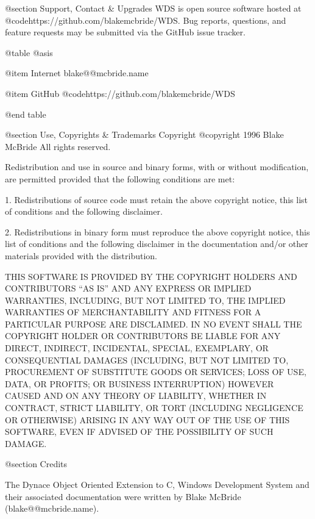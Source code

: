 @section Support, Contact & Upgrades
WDS is open source software hosted at
@code{https://github.com/blakemcbride/WDS}.  Bug reports, questions,
and feature requests may be submitted via the GitHub issue tracker.

@table @asis

@item Internet
blake@@mcbride.name

@item GitHub
@code{https://github.com/blakemcbride/WDS}

@end table




@section Use, Copyrights & Trademarks
Copyright  @copyright{} 1996 Blake McBride
All rights reserved.

Redistribution and use in source and binary forms, with or without
modification, are permitted provided that the following conditions are
met:

1. Redistributions of source code must retain the above copyright
notice, this list of conditions and the following disclaimer.

2. Redistributions in binary form must reproduce the above copyright
notice, this list of conditions and the following disclaimer in the
documentation and/or other materials provided with the distribution.

THIS SOFTWARE IS PROVIDED BY THE COPYRIGHT HOLDERS AND CONTRIBUTORS
``AS IS'' AND ANY EXPRESS OR IMPLIED WARRANTIES, INCLUDING, BUT NOT
LIMITED TO, THE IMPLIED WARRANTIES OF MERCHANTABILITY AND FITNESS FOR
A PARTICULAR PURPOSE ARE DISCLAIMED. IN NO EVENT SHALL THE COPYRIGHT
HOLDER OR CONTRIBUTORS BE LIABLE FOR ANY DIRECT, INDIRECT, INCIDENTAL,
SPECIAL, EXEMPLARY, OR CONSEQUENTIAL DAMAGES (INCLUDING, BUT NOT
LIMITED TO, PROCUREMENT OF SUBSTITUTE GOODS OR SERVICES; LOSS OF USE,
DATA, OR PROFITS; OR BUSINESS INTERRUPTION) HOWEVER CAUSED AND ON ANY
THEORY OF LIABILITY, WHETHER IN CONTRACT, STRICT LIABILITY, OR TORT
(INCLUDING NEGLIGENCE OR OTHERWISE) ARISING IN ANY WAY OUT OF THE USE
OF THIS SOFTWARE, EVEN IF ADVISED OF THE POSSIBILITY OF SUCH DAMAGE.


@section Credits

The Dynace Object Oriented Extension to C, Windows Development System
and their associated documentation were written by Blake McBride
(blake@@mcbride.name).


